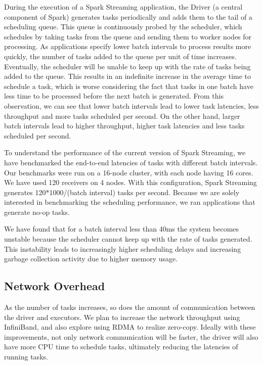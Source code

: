 During the execution of a Spark Streaming application, the Driver (a central component of Spark) generates tasks periodically and adds them to the tail of a scheduling queue. This queue is continuously probed by the scheduler, which schedules by taking tasks from the queue and sending them to worker nodes for processing.
As applications specify lower batch intervals to process results more quickly, the number of tasks added to the queue per unit of time increases. Eventually, the scheduler will be unable to keep up with the rate of tasks being added to the queue. This results in an indefinite increase in the average time to schedule a task, which is worse considering the fact that tasks in one batch have less time to be processed before the next batch is generated.
From this observation, we can see that lower batch intervals lead to lower task latencies, less throughput and more tasks scheduled per second. On the other hand, larger batch intervals lead to higher throughput, higher task latencies and less tasks scheduled per second. 

To understand the performance of the current version of Spark Streaming, we have benchmarked the end-to-end latencies of tasks with different batch intervals. 
Our benchmarks were run on a 16-node cluster, with each node having 16 cores. We have used 120 receivers on 4 nodes. 
With this configuration, Spark Streaming generates 120$*$1000/(batch interval) tasks per second.
Because we are solely interested in benchmarking the scheduling performance, we ran applications that generate no-op tasks.

We have found that for a batch interval less than 40ms the system becomes unstable because the scheduler cannot keep up with the rate of tasks generated. This instability leads to increasingly higher scheduling delays and increasing garbage collection activity due to higher memory usage. 


\subsection{Network Overhead}
As the number of tasks increases, so does the amount of communication between the driver and executors. We plan to increase the network throughput using InfiniBand, and also explore using RDMA to realize zero-copy. Ideally with these improvements, not only network communication will be faster, the driver will also have more CPU time to schedule tasks, ultimately reducing the latencies of running tasks.


